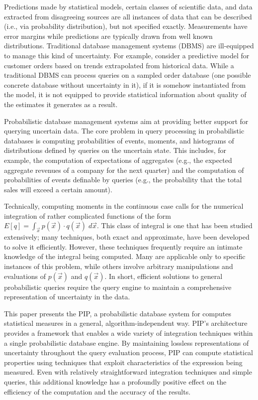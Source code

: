 Predictions made by statistical models, certain classes of scientific data, and data extracted from disagreeing sources are all instances of data that can be described (i.e., via probability distribution), but not specified exactly.  Measurements have error margins while predictions are typically drawn from well known distributions.  Traditional database management systems (DBMS) are ill-equipped to manage this kind of uncertainty.  For  example, consider  a predictive model  for customer orders based  on trends extrapolated  from historical data.   While a traditional  DBMS can process  queries on  a sampled  order data\-base (one possible  concrete database without  uncertainty in it), if  it is somehow instantiated  from the  model, it is  not equipped  to provide statistical information about quality of the estimates it generates as a result.

Probabilistic  database  management  systems \cite{dalvi07efficient, WidomTrio2008, KochMayBMS2008, SD2007, ORION, MCDB, BayesStore} aim at providing better support for querying uncertain data.  The core problem in query processing in probabilistic databases is computing probabilities of events, moments, and histograms of distributions defined by queries on the uncertain state.  This includes, for example, the computation of expectations of aggregates (e.g., the expected aggregate revenues of a company for the next quarter) and the computation of probabilities of events definable by queries (e.g., the probability that the total sales will exceed a certain amount).

Technically, computing moments in the continuous case calls for the numerical integration of rather complicated functions of the form $E[q] = \int_{\vec x} p(\vec{x}) \cdot q(\vec{x}) \; d\vec{x}.$
This class of integral is one that has been studied extensively; many techniques, both exact and approximate, have been developed to solve it efficiently.  However, these techniques frequently require an intimate knowledge of the integral being computed.  Many are applicable only to specific instances of this problem, while others involve arbitrary manipulations and evaluations of $p(\vec x)$ and $q(\vec x)$.  In short, efficient solutions to general probabilistic queries require the query engine to maintain a comprehensive representation of uncertainty in the data.

This paper presents the PIP, a probabilistic database system for computes statistical measures in a general, algorithm-independent way.  PIP's architecture provides a framework that enables a wide variety of integration techniques within a single probabilistic database engine.  By maintaining lossless representations of uncertainty throughout the query evaluation process, PIP can compute statistical properties using techniques that exploit characteristics of the expression being measured.  Even with relatively straightforward integration techniques and simple queries, this additional knowledge has a profoundly positive effect on the efficiency of the computation and the accuracy of the results.

